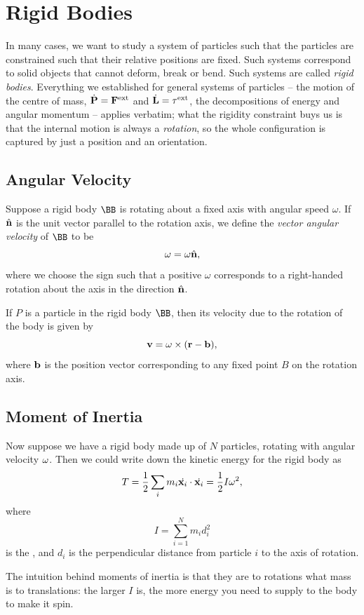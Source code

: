 \documentclass[a4paper]{scrartcl}
\newcommand{\hh}[1]{\hat{\vv{#1}}}
\begin{document}
\section{Rigid Bodies} \label{sec:rigid}

In many cases, we want to study a system of particles such that the particles are constrained such that their relative positions are fixed. Such systems correspond to solid objects that cannot deform, break or bend.
Such systems are called \emph{rigid bodies}. Everything we established for general systems of particles -- the motion of the centre of mass, $\dot{\mathbf{P}} = \mathbf{F}^{\text{ext}}$ and $\dot{\mathbf{L}} = \mathbf{\tau}^{\text{ext}}$, the decompositions of energy and angular momentum -- applies verbatim; what the rigidity constraint buys us is that the internal motion is always a \emph{rotation}, so the whole configuration is captured by just a position and an orientation.

\subsection{Angular Velocity}

Suppose a rigid body $\BB$ is rotating about a fixed axis with angular speed $\omega$. If $\hh n$ is the unit vector parallel to the rotation axis, we define the \emph{vector angular velocity} of $\BB$ to be
$$
\vv \omega = \omega \hh n,
$$
where we choose the sign such that a positive $\omega$ corresponds to a right-handed rotation about the axis in the direction $\hh n$.

If $P$ is a particle in the rigid body $\BB$, then its velocity due to the rotation of the body is given by
$$
\mathbf{v} = \mathbf{\omega} \times (\mathbf{r} - \mathbf{b}),
$$
where $\mathbf{b}$ is the position vector corresponding to any fixed point $B$ on the rotation axis.

\subsection{Moment of Inertia}

Now suppose we have a rigid body made up of $N$ particles, rotating with angular velocity $\mathbf{\omega}$. Then we could write down the kinetic energy for the rigid body as
$$
T = \frac{1}{2} \sum_{i} m_i  \dot{\mathbf{x}_i} \cdot \dot{\mathbf{x}_i} = \frac{1}{2}I \omega^2,
$$
where
$$
I = \sum_{i = 1}^N m_i d_i^2
$$
is the , and $d_i$ is the perpendicular distance from particle $i$ to the axis of rotation.

The intuition behind moments of inertia is that they are to rotations what mass is to translations: the larger $I$ is, the more energy you need to supply to the body to make it spin.
\end{document}
